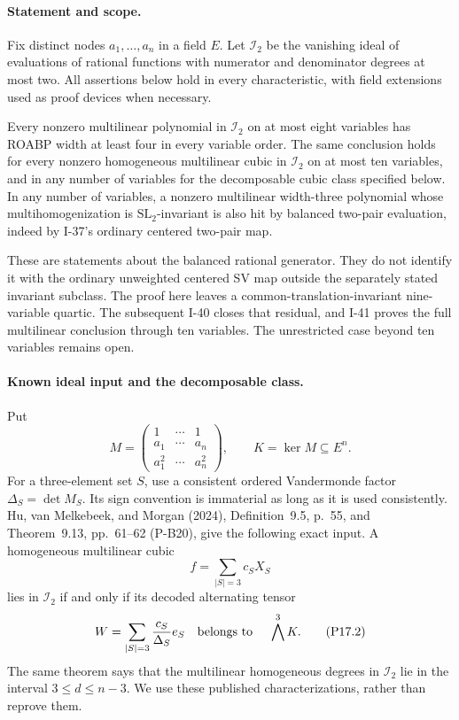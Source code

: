\paragraph{Statement and scope.}
Fix distinct nodes $a_1,\ldots,a_n$ in a field $E$.
Let $\mathcal I_2$ be the vanishing ideal of evaluations of rational
functions with numerator and denominator degrees at most two.
All assertions below hold in every characteristic, with field
extensions used as proof devices when necessary.

Every nonzero multilinear polynomial in $\mathcal I_2$ on at most
eight variables has ROABP width at least four in every variable
order. The same conclusion holds for every nonzero homogeneous
multilinear cubic in $\mathcal I_2$ on at most ten variables,
and in any number of variables for the decomposable cubic class
specified below. In any number of variables, a nonzero multilinear
width-three polynomial whose multihomogenization is
$\mathrm{SL}_2$-invariant is also hit by balanced two-pair
evaluation, indeed by I-37's ordinary centered two-pair map.

These are statements about the balanced rational generator.
They do not identify it with the ordinary unweighted centered SV
map outside the separately stated invariant subclass. The
proof here leaves a common-translation-invariant nine-variable
quartic. The subsequent I-40 closes that residual, and I-41
proves the full multilinear conclusion through ten variables.
The unrestricted case beyond ten variables remains open.

\paragraph{Known ideal input and the decomposable class.}
Put
\[
 M=\begin{pmatrix}1&\cdots&1\\a_1&\cdots&a_n\\a_1^2&\cdots&a_n^2\end{pmatrix},
 \qquad K=\ker M\subseteq E^n.
 \tag{P17.1}
\]
For a three-element set $S$, use a consistent ordered Vandermonde
factor $\Delta_S=\det M_S$. Its sign convention is immaterial as
long as it is used consistently. Hu, van Melkebeek, and Morgan
(2024), Definition~9.5, p.~55, and Theorem~9.13, pp.~61--62
(P-B20), give the following exact input. A homogeneous multilinear
cubic
\[
 f=\sum_{|S|=3}c_S X_S
\]
lies in $\mathcal I_2$ if and only if its decoded alternating tensor
\[
 W=\sum_{|S|=3}\frac{c_S}{\Delta_S}e_S
       \quad\hbox{belongs to }\quad\bigwedge^3 K.
 \tag{P17.2}
\]
The same theorem says that the multilinear homogeneous degrees in
$\mathcal I_2$ lie in the interval $3\le d\le n-3$. We use these
published characterizations, rather than reprove them.

